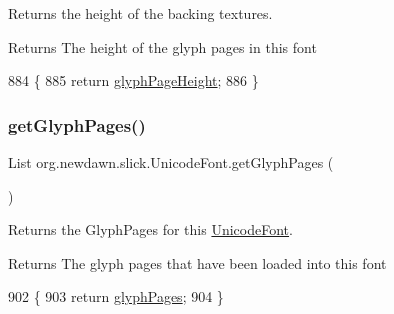 Returns the height of the backing textures.

\begin{DoxyReturn}{Returns}
The height of the glyph pages in this font 
\end{DoxyReturn}

\begin{DoxyCode}
884                                     \{
885         \textcolor{keywordflow}{return} \mbox{\hyperlink{classorg_1_1newdawn_1_1slick_1_1_unicode_font_ac919dac32be8c1baf29a21625e0719b9}{glyphPageHeight}};
886     \}
\end{DoxyCode}
\mbox{\label{classorg_1_1newdawn_1_1slick_1_1_unicode_font_a04594e2bc110dd31237e54caea2cfb78}} 
\subsubsection{\texorpdfstring{get\+Glyph\+Pages()}{getGlyphPages()}}
{\footnotesize\ttfamily List org.\+newdawn.\+slick.\+Unicode\+Font.\+get\+Glyph\+Pages (\begin{DoxyParamCaption}{ }\end{DoxyParamCaption})\hspace{0.3cm}{\ttfamily [inline]}}

Returns the Glyph\+Pages for this \mbox{\hyperlink{classorg_1_1newdawn_1_1slick_1_1_unicode_font}{Unicode\+Font}}.

\begin{DoxyReturn}{Returns}
The glyph pages that have been loaded into this font 
\end{DoxyReturn}

\begin{DoxyCode}
902                                  \{
903         \textcolor{keywordflow}{return} \mbox{\hyperlink{classorg_1_1newdawn_1_1slick_1_1_unicode_font_aa371c2e8adc81e8186fa3ef74c6f6a59}{glyphPages}};
904     \}
\end{DoxyCode}
\mbox{\label{classorg_1_1newdawn_1_1slick_1_1_unicode_font_a1a033ce1ceec45ced33842cdf6e25670}} 
